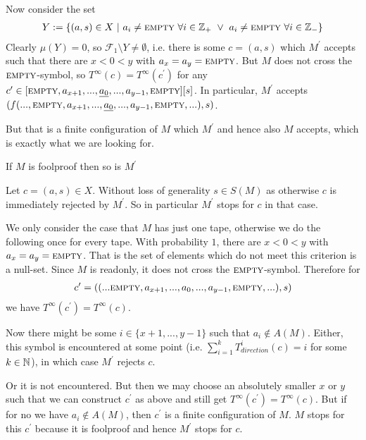 		Now consider the set
		\begin{align*}
			Y := \{ (a,s) \in X ~|~ a_i \neq \text{\scshape{empty}} ~\forall i \in \mathbb{Z}_+ ~\vee~ a_i \neq \text{\scshape{empty}} ~\forall i \in \mathbb{Z}_{-} \}
		\end{align*}
		Clearly $\mu(Y) = 0$, so $\mathcal{F}_1 \setminus Y \neq \emptyset$, i.e. there is some $c = (a,s)$ which $M^\prime$ accepts such that there are $x < 0 < y$ with $a_x = a_y = \text{\scshape{empty}}$.
		But $M$ does not cross the $\text{\scshape{empty}}$-symbol, so $T^\infty(c) = T^\infty(c^\prime)$ for any $c^\prime \in \lbrack \text{\scshape{empty}}, a_{x+1}, ... , \underline{a_0}, ... , a_{y-1}, \text{\scshape{empty}} \rbrack \lbrack s \rbrack$.
		In particular, $M^\prime$ accepts $(f(...,\text{\scshape{empty}},a_{x+1},...,\underline{a_0},...,a_{y-1},\text{\scshape{empty}},...),s)$.
		
		But that is a finite configuration of $M$ which $M^\prime$ and hence also $M$ accepts, which is exactly what we are looking for.
\endproof

\begin{Lemma}
	\label{tm_to_tds:properties:lemma_foolproof}
	If $M$ is foolproof then so is $M^\prime$
\end{Lemma}
\proof
	Let $c = (a,s) \in X$. Without loss of generality $s \in S(M)$ as otherwise $c$ is immediately rejected by $M^\prime$. So in particular $M^\prime$ stops for $c$ in that case.

	We only consider the case that $M$ has just one tape, otherwise we do the following once for every tape.
	With probability $1$, there are $x < 0 < y$ with $a_x = a_y = \text{\scshape{empty}}$.
	That is the set of elements which do not meet this criterion is a null-set.
	Since $M$ is readonly, it does not cross the $\text{\scshape{empty}}$-symbol. Therefore for
	\begin{align*}
		c^\prime = ((...\text{\scshape{empty}},a_{x+1},...,a_0,...,a_{y-1},\text{\scshape{empty}},...) , s)
	\end{align*} 
	we have $T^\infty(c^\prime) = T^\infty(c)$.

	Now there might be some $i \in \{x+1,...,y-1\}$ such that $a_i \notin A(M)$.
	Either, this symbol is encountered at some point (i.e. $\sum_{i=1}^k T_{direction}^i(c) = i$ for some $k \in \mathbb{N}$), in which case $M^\prime$ rejects $c$.

	Or it is not encountered. But then we may choose an absolutely smaller $x$ or $y$ such that we can construct $c^\prime$ as above and still get $T^\infty(c^\prime) = T^\infty(c)$.
	But if for no  we have $a_i \notin A(M)$, then $c^\prime$ is a finite configuration of $M$.
	$M$ stops for this $c^\prime$ because it is foolproof and hence $M^\prime$ stops for $c$.

